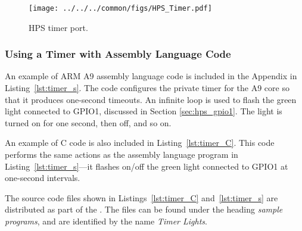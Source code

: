 \begin{figure}[h]
   \begin{center}
       \texttt{[image: ../../../common/figs/HPS\_Timer.pdf]}
   \end{center}
   \caption{HPS timer port.}
	\label{fig:HPS_timer}
\end{figure}

\subsubsection{Using a Timer with Assembly Language Code}
\label{sec:ARM_assembly}
An example of ARM A9 assembly language code is included in the Appendix in Listing~\ref{lst:timer_s}. The code 
configures the private timer for the A9 core so that it produces one-second timeouts. An
infinite loop is used to flash the green light connected to GPIO1, discussed
in Section \ref{sec:hps_gpio1}. The light is turned on for one second, then off, and so on.

An example of C code is also included in Listing~\ref{lst:timer_C}. This code performs the same actions 
as the assembly language program in Listing~\ref{lst:timer_s}---it flashes on/off the green 
light connected to GPIO1 at one-second intervals.

The source code files shown in Listings~\ref{lst:timer_C} and~\ref{lst:timer_s}
are distributed as part of the  
\productNameMed{}. The files can be found under the heading {\it sample programs}, 
and are identified by the name {\it Timer Lights}.


